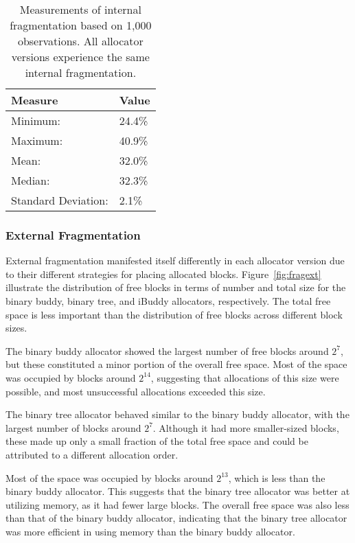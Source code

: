 \begin{table}[h]
  \begin{tabular}{|l|l|}
    \hline
    \textbf{Measure}    & \textbf{Value} \\ \hline
    Minimum:            & 24.4\%         \\ \hline
    Maximum:            & 40.9\%         \\ \hline
    Mean:               & 32.0\%         \\ \hline
    Median:             & 32.3\%         \\ \hline
    Standard Deviation: & 2.1\%          \\ \hline
  \end{tabular}
  \centering
  \caption{Measurements of internal fragmentation based on 1,000 observations. All allocator versions experience the same internal fragmentation.}
  \label{table:fraginternal}
\end{table}

\subsubsection{External Fragmentation}
External fragmentation manifested itself differently in each allocator version due to their different strategies for placing allocated blocks. Figure~\ref{fig:fragext} illustrate the distribution of free blocks in terms of number and total size for the binary buddy, binary tree, and iBuddy allocators, respectively. The total free space is less important than the distribution of free blocks across different block sizes.

The binary buddy allocator showed the largest number of free blocks around $2^7$, but these constituted a minor portion of the overall free space. Most of the space was occupied by blocks around $2^{14}$, suggesting that allocations of this size were possible, and most unsuccessful allocations exceeded this size.

The binary tree allocator behaved similar to the binary buddy allocator, with the largest number of blocks around $2^7$.
Although it had more smaller-sized blocks, these made up only a small fraction of the total free space and could be attributed to a different allocation order.

Most of the space was occupied by blocks around $2^{13}$, which is less than the binary buddy allocator. This suggests that the binary tree allocator was better at utilizing memory, as it had fewer large blocks. The overall free space was also less than that of the binary buddy allocator, indicating that the binary tree allocator was more efficient in using memory than the binary buddy allocator.

